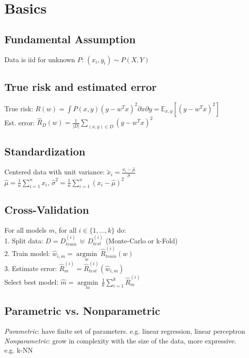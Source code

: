 \section*{Basics}

\subsection*{Fundamental Assumption}
Data is iid for unknown $P$: $(x_i, y_i) \sim P(X,Y)$

\subsection*{True risk and estimated error}
True risk: $R(w) = \int P(x,y) (y-w^Tx)^2 \partial x \partial y = \mathbb{E}_{x,y}[(y-w^Tx)^2]$ \\
Est. error: $\hat{R}_D(w) = \frac{1}{|D|}\sum_{(x,y)\in D} (y-w^Tx)^2$

\subsection*{Standardization}
Centered data with unit variance:
$\tilde{x}_{i} = \frac{x_{i}-\hat{\mu}}{\hat{\sigma}}$\\
$\hat{\mu} = \frac{1}{n}\sum_{i=1}^n x_{i}$, $\hat{\sigma}^2 = \frac{1}{n}\sum_{i=1}^n {(x_{i}-\hat{\mu})}^2$ 

\subsection*{Cross-Validation}
For all models $m$, for all $i \in \{ 1, ..., k \}$ do:\\
1. Split data: $D = D_{train}^{(i)} ~ \uplus ~ D_{test}^{(i)} $ (Monte-Carlo or k-Fold) \\
2. Train model: $\hat{w}_{i,m} = \underset{w}{\operatorname{argmin}} ~ \hat{R}_{train}^{(i)} (w)$ \\
3. Estimate error: $\hat{R}_{m}^{(i)} = \hat{R}_{test}^{(i)} (\hat{w}_{i,m})$ \\
Select best model: $\hat{m} = \underset{m}{\operatorname{argmin}} ~ \frac{1}{k} \sum_{i=1}^{k} \hat{R}_{m}^{(i)}$

\subsection*{Parametric vs. Nonparametric}
\emph{Parametric}: have finite set of parameters. 
e.g. linear regression, linear perceptron\\
\emph{Nonparametric}: grow in complexity with the size of the data, more expressive.
e.g. k-NN

